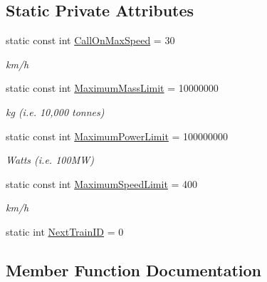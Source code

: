 \subsection*{Static Private Attributes}
\begin{DoxyCompactItemize}
\item 
\mbox{\label{class_t_train_a70e34e0666fd1c04b6c9866bfe45290f}} 
static const int \mbox{\hyperlink{class_t_train_a70e34e0666fd1c04b6c9866bfe45290f}{Call\+On\+Max\+Speed}} = 30
\begin{DoxyCompactList}\small\item\em km/h \end{DoxyCompactList}\item 
\mbox{\label{class_t_train_a1ab673136ad153947d373b5fd48a50e9}} 
static const int \mbox{\hyperlink{class_t_train_a1ab673136ad153947d373b5fd48a50e9}{Maximum\+Mass\+Limit}} = 10000000
\begin{DoxyCompactList}\small\item\em kg (i.\+e. 10,000 tonnes) \end{DoxyCompactList}\item 
\mbox{\label{class_t_train_a06452bf9f2c18e9d83d4b33cc24ada42}} 
static const int \mbox{\hyperlink{class_t_train_a06452bf9f2c18e9d83d4b33cc24ada42}{Maximum\+Power\+Limit}} = 100000000
\begin{DoxyCompactList}\small\item\em Watts (i.\+e. 100\+MW) \end{DoxyCompactList}\item 
\mbox{\label{class_t_train_afac2548a159e8c341c008810d15e2a88}} 
static const int \mbox{\hyperlink{class_t_train_afac2548a159e8c341c008810d15e2a88}{Maximum\+Speed\+Limit}} = 400
\begin{DoxyCompactList}\small\item\em km/h \end{DoxyCompactList}\item 
static int \mbox{\hyperlink{class_t_train_a59a6ad055b319a73e954e9bef5f7593c}{Next\+Train\+ID}} = 0
\end{DoxyCompactItemize}


\subsection{Member Function Documentation}
\mbox{\label{class_t_train_ae34370de578ebd07a217c79d8b67312c}} 
